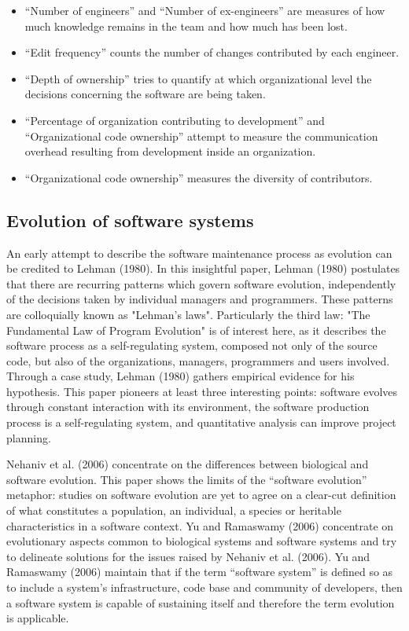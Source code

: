 \begin{itemize}
  \item{“Number of engineers” and “Number of ex-engineers” are measures of how much knowledge remains in the team and how much has been lost.}
  \item{“Edit frequency” counts the number of changes contributed by each engineer.}
  \item{“Depth of ownership” tries to quantify at which organizational level the decisions concerning the software are being taken.}
  \item{“Percentage of organization contributing to development” and “Organizational code ownership” attempt to measure the communication overhead resulting from development inside an organization.}
  \item{“Organizational code ownership” measures the diversity of contributors.}
\end{itemize}

\subsection{Evolution of software systems}
An early attempt to describe the software maintenance process as evolution can be credited to Lehman (1980). In this insightful paper, Lehman (1980) postulates that there are recurring patterns which govern software evolution, independently of the decisions taken by individual managers and programmers. These patterns are colloquially known as "Lehman's laws". Particularly the third law: "The Fundamental Law of Program Evolution" is of interest here, as it describes the software process as a self-regulating system, composed not only of the source code, but also of the organizations, managers, programmers and users involved. Through a case study, Lehman (1980) gathers empirical evidence for his hypothesis. This paper pioneers at least three interesting points: software evolves through constant interaction with its environment, the software production process is a self-regulating system, and quantitative analysis can improve project planning.

Nehaniv et al. (2006) concentrate on the differences between biological and software evolution. This paper shows the limits of the “software evolution” metaphor: studies on software evolution are yet to agree on a clear-cut definition of what constitutes a population, an individual, a species or heritable characteristics in a software context. Yu and Ramaswamy (2006) concentrate on evolutionary aspects common to biological systems and software systems and try to delineate solutions for the issues raised by Nehaniv et al. (2006). Yu and Ramaswamy (2006) maintain that if the term “software system” is defined so as to include a system's infrastructure, code base and community of developers, then a software system is capable of sustaining itself and therefore the term evolution is applicable.

